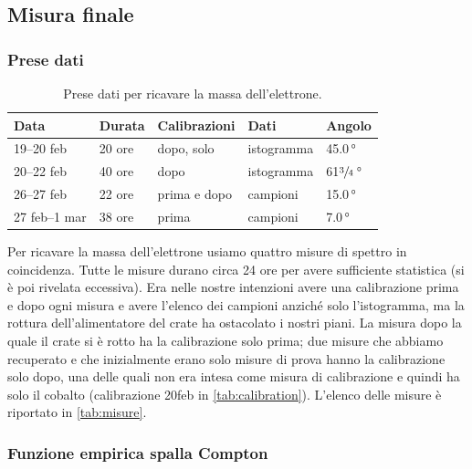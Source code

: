 \subsection{Misura finale}\label{par:fondo2}

\subsubsection{Prese dati}

\begin{table}
	\centering
	\begin{tabular}{lllll}
		\toprule
		Data & Durata & Calibrazioni & Dati & Angolo \\
		\midrule
		19--20 feb    & 20 ore & dopo, solo \co & istogramma &           45.0\,\si{\degree} \\
		20--22 feb    & 40 ore & dopo           & istogramma &   61$\sfrac34$\,\si{\degree} \\
		26--27 feb    & 22 ore & prima e dopo   & campioni   &           15.0\,\si{\degree} \\
		27 feb--1 mar & 38 ore & prima          & campioni   & \phantom{1}7.0\,\si{\degree} \\
		\bottomrule
	\end{tabular}
	\caption{\label{tab:misure}
	Prese dati per ricavare la massa dell'elettrone.}
\end{table}

Per ricavare la massa dell'elettrone usiamo quattro misure di spettro in coincidenza.
Tutte le misure durano circa 24 ore per avere sufficiente statistica (si è poi rivelata eccessiva).
Era nelle nostre intenzioni avere una calibrazione prima e dopo ogni misura
e avere l'elenco dei campioni anziché solo l'istogramma,
ma la rottura dell'alimentatore del crate ha ostacolato i nostri piani.
La misura dopo la quale il crate si è rotto ha la calibrazione solo prima;
due misure che abbiamo recuperato e che inizialmente erano solo misure di prova hanno la calibrazione solo dopo,
una delle quali non era intesa come misura di calibrazione e quindi ha solo il cobalto
(calibrazione 20feb in \autoref{tab:calibration}).
L'elenco delle misure è riportato in \autoref{tab:misure}.

\subsubsection{Funzione empirica spalla Compton}

